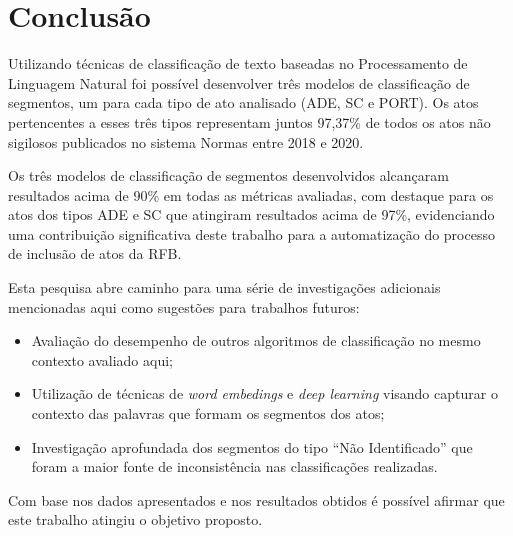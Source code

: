 \section{Conclusão}

Utilizando técnicas de classificação de texto baseadas no Processamento de Linguagem Natural foi possível desenvolver três modelos de classificação de segmentos, um para cada tipo de ato analisado (ADE, SC e PORT). Os atos pertencentes a esses três tipos representam juntos 97,37\% de todos os atos não sigilosos publicados no sistema Normas entre 2018 e 2020.

Os três modelos de classificação de segmentos desenvolvidos alcançaram resultados acima de 90\% em todas as métricas avaliadas, com destaque para os atos dos tipos ADE e SC que atingiram resultados acima de 97\%, evidenciando uma contribuição significativa deste trabalho para a automatização do processo de inclusão de atos da RFB.


Esta pesquisa abre caminho para uma série de investigações adicionais mencionadas aqui como sugestões para trabalhos futuros: 
\begin{itemize}
	\item Avaliação do desempenho de outros algoritmos de classificação no mesmo contexto avaliado aqui;
	\item Utilização de técnicas de \textit{word embedings} e \textit{deep learning} visando capturar o contexto das palavras que formam os segmentos dos atos;
	\item Investigação aprofundada dos segmentos do tipo ``Não Identificado'' que foram a maior fonte de inconsistência nas classificações realizadas.
\end{itemize}

Com base nos dados apresentados e nos resultados obtidos é possível afirmar que este trabalho atingiu o objetivo proposto.


\begin{figure}
\label{fig:fake}
\end{figure}